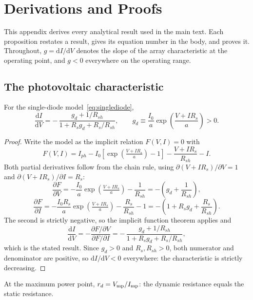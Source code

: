\chapter{Derivations and Proofs}
\label{app:proofs}

This appendix derives every analytical result used in the main text. Each
proposition restates a result, gives its equation number in the body, and proves
it. Throughout, $g = \mathrm{d}I/\mathrm{d}V$ denotes the slope of the array
characteristic at the operating point, and $g < 0$ everywhere on the
operating range.

\section{The photovoltaic characteristic}

\begin{proposition}
\label{prop:didv}
For the single-diode model~\eqref{eq:singlediode},
\[
\frac{\mathrm{d}I}{\mathrm{d}V}
= -\,\frac{g_d + 1/R_{sh}}{1 + R_s g_d + R_s/R_{sh}},
\qquad
g_d \equiv \frac{I_0}{a}\exp\!\left(\frac{V + I R_s}{a}\right) > 0 .
\]
\end{proposition}

\begin{proof}
Write the model as the implicit relation $F(V,I) = 0$ with
\[
F(V,I) = I_{ph} - I_0\!\left[\exp\!\left(\tfrac{V + I R_s}{a}\right) - 1\right]
         - \frac{V + I R_s}{R_{sh}} - I .
\]
Both partial derivatives follow from the chain rule, using
$\partial(V+IR_s)/\partial V = 1$ and $\partial(V+IR_s)/\partial I = R_s$:
\[
\frac{\partial F}{\partial V} = -\frac{I_0}{a}\exp\!\left(\tfrac{V+IR_s}{a}\right) - \frac{1}{R_{sh}}
= -\left(g_d + \frac{1}{R_{sh}}\right),
\]
\[
\frac{\partial F}{\partial I} = -\frac{I_0 R_s}{a}\exp\!\left(\tfrac{V+IR_s}{a}\right) - \frac{R_s}{R_{sh}} - 1
= -\left(1 + R_s g_d + \frac{R_s}{R_{sh}}\right).
\]
The second is strictly negative, so the implicit function theorem applies and
\[
\frac{\mathrm{d}I}{\mathrm{d}V} = -\frac{\partial F/\partial V}{\partial F/\partial I}
= -\,\frac{g_d + 1/R_{sh}}{1 + R_s g_d + R_s/R_{sh}} ,
\]
which is the stated result. Since $g_d > 0$ and $R_s, R_{sh} > 0$, both
numerator and denominator are positive, so $\mathrm{d}I/\mathrm{d}V < 0$
everywhere: the characteristic is strictly decreasing.
\end{proof}

\begin{proposition}
\label{prop:rdmpp}
At the maximum power point, $r_d = V_{\mathrm{mp}}/I_{\mathrm{mp}}$: the dynamic resistance equals the
static resistance.
\end{proposition}

